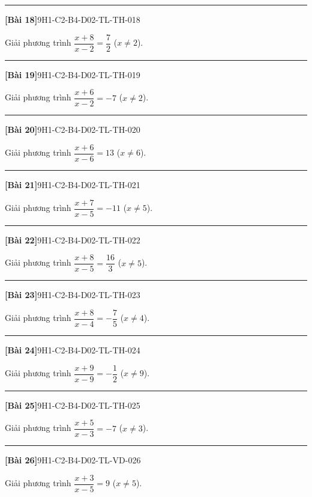\documentclass[12pt,a4paper]{article}
\newif\ifloigiai
\newenvironment{cauhoi}[2]{%
  \par\medskip\noindent\rule{\textwidth}{0.4pt}\par\nopagebreak
  \noindent\textbf{[#1]}\hfill{\scriptsize\ttfamily #2}\par\nopagebreak\smallskip}{\par}
\newcommand{\loigiai}[1]{\ifloigiai\par\smallskip\noindent\textit{Lời giải.} #1\par\fi}
\begin{document}
\begin{cauhoi}{Bài 18}{9H1-C2-B4-D02-TL-TH-018}
Giải phương trình $\dfrac{x+8}{x-2}=\dfrac{7}{2}$ ($x\ne 2$).
\loigiai{Điều kiện $x\ne 2$. Nhân hai vế với $x-2$: $x+8=\dfrac{7}{2}(x-2)$. Giải ta được $x=6$ (thoả điều kiện).}
\end{cauhoi}
\begin{cauhoi}{Bài 19}{9H1-C2-B4-D02-TL-TH-019}
Giải phương trình $\dfrac{x+6}{x-2}=-7$ ($x\ne 2$).
\loigiai{Điều kiện $x\ne 2$. Nhân hai vế với $x-2$: $x+6=-7(x-2)$. Giải ta được $x=1$ (thoả điều kiện).}
\end{cauhoi}
\begin{cauhoi}{Bài 20}{9H1-C2-B4-D02-TL-TH-020}
Giải phương trình $\dfrac{x+6}{x-6}=13$ ($x\ne 6$).
\loigiai{Điều kiện $x\ne 6$. Nhân hai vế với $x-6$: $x+6=13(x-6)$. Giải ta được $x=7$ (thoả điều kiện).}
\end{cauhoi}
\begin{cauhoi}{Bài 21}{9H1-C2-B4-D02-TL-TH-021}
Giải phương trình $\dfrac{x+7}{x-5}=-11$ ($x\ne 5$).
\loigiai{Điều kiện $x\ne 5$. Nhân hai vế với $x-5$: $x+7=-11(x-5)$. Giải ta được $x=4$ (thoả điều kiện).}
\end{cauhoi}
\begin{cauhoi}{Bài 22}{9H1-C2-B4-D02-TL-TH-022}
Giải phương trình $\dfrac{x+8}{x-5}=\dfrac{16}{3}$ ($x\ne 5$).
\loigiai{Điều kiện $x\ne 5$. Nhân hai vế với $x-5$: $x+8=\dfrac{16}{3}(x-5)$. Giải ta được $x=8$ (thoả điều kiện).}
\end{cauhoi}
\begin{cauhoi}{Bài 23}{9H1-C2-B4-D02-TL-TH-023}
Giải phương trình $\dfrac{x+8}{x-4}=-\dfrac{7}{5}$ ($x\ne 4$).
\loigiai{Điều kiện $x\ne 4$. Nhân hai vế với $x-4$: $x+8=-\dfrac{7}{5}(x-4)$. Giải ta được $x=-1$ (thoả điều kiện).}
\end{cauhoi}
\begin{cauhoi}{Bài 24}{9H1-C2-B4-D02-TL-TH-024}
Giải phương trình $\dfrac{x+9}{x-9}=-\dfrac{1}{2}$ ($x\ne 9$).
\loigiai{Điều kiện $x\ne 9$. Nhân hai vế với $x-9$: $x+9=-\dfrac{1}{2}(x-9)$. Giải ta được $x=-3$ (thoả điều kiện).}
\end{cauhoi}
\begin{cauhoi}{Bài 25}{9H1-C2-B4-D02-TL-TH-025}
Giải phương trình $\dfrac{x+5}{x-3}=-7$ ($x\ne 3$).
\loigiai{Điều kiện $x\ne 3$. Nhân hai vế với $x-3$: $x+5=-7(x-3)$. Giải ta được $x=2$ (thoả điều kiện).}
\end{cauhoi}
\begin{cauhoi}{Bài 26}{9H1-C2-B4-D02-TL-VD-026}
Giải phương trình $\dfrac{x+3}{x-5}=9$ ($x\ne 5$).
\loigiai{Điều kiện $x\ne 5$. Nhân hai vế với $x-5$: $x+3=9(x-5)$. Giải ta được $x=6$ (thoả điều kiện).}
\end{cauhoi}
\end{document}
